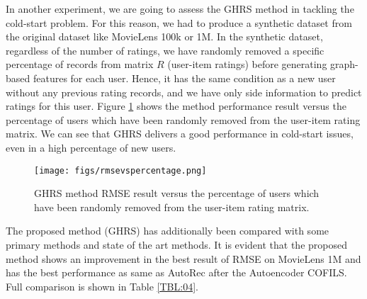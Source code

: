 \documentclass[a4paper,fleqn]{cas-dc}
\begin{document}
In another experiment, we are going to assess the GHRS method in tackling the cold-start problem. For this reason, we had to produce a synthetic dataset from the original dataset like MovieLens 100k or 1M. In the synthetic dataset, regardless of the number of ratings, we have randomly removed a specific percentage of records from matrix $R$ (user-item ratings) before generating graph-based features for each user. Hence, it has the same condition as a new user without any previous rating records, and we have only side information to predict ratings for this user. Figure \ref{FIG:13} shows the method performance result versus the percentage of users which have been randomly removed from the user-item rating matrix. We can see that GHRS delivers a good performance in cold-start issues, even in a high percentage of new users.

\begin{figure}
	\centering
	\texttt{[image: figs/rmsevspercentage.png]}
	\caption{GHRS method RMSE result versus the percentage of users which have been randomly removed from the user-item rating matrix.}
	\label{FIG:13}
\end{figure}

The proposed method (GHRS) has additionally been compared with some primary methods and state of the art methods. It is evident that the proposed method shows an improvement in the best result of RMSE on MovieLens 1M and has the best performance as same as AutoRec after the Autoencoder COFILS. Full comparison is shown in Table \ref{TBL:04}.
\end{document}

